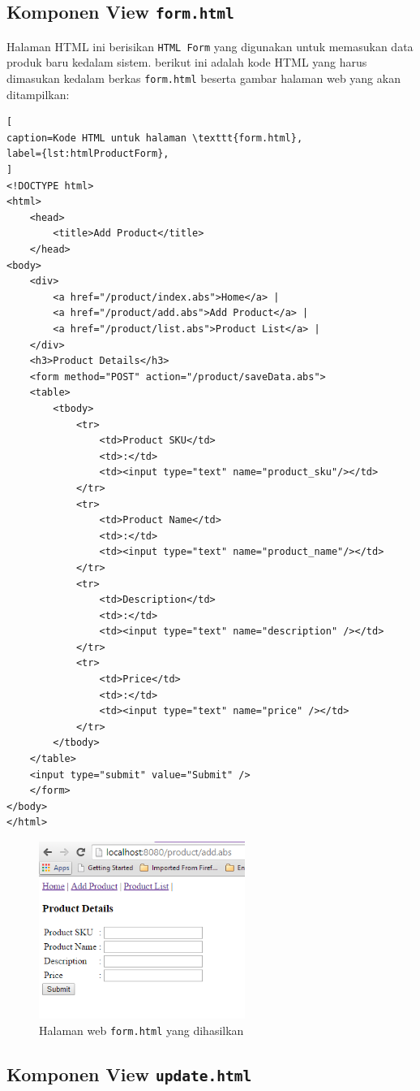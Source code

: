 \subsection{Komponen View \texttt{form.html}}
Halaman HTML ini berisikan \texttt{HTML Form} yang digunakan untuk memasukan data produk baru kedalam sistem. berikut ini adalah kode HTML yang harus dimasukan kedalam berkas \texttt{form.html} beserta gambar halaman web yang akan ditampilkan:

\begin{lstlisting}[
caption=Kode HTML untuk halaman \texttt{form.html},
label={lst:htmlProductForm},
]
<!DOCTYPE html>
<html>
	<head>
		<title>Add Product</title>
	</head>
<body>
	<div>
		<a href="/product/index.abs">Home</a> |
		<a href="/product/add.abs">Add Product</a> |
		<a href="/product/list.abs">Product List</a> |
	</div>
	<h3>Product Details</h3>
	<form method="POST" action="/product/saveData.abs">
	<table>
		<tbody>
			<tr>
				<td>Product SKU</td>
				<td>:</td>
				<td><input type="text" name="product_sku"/></td>
			</tr>
			<tr>
				<td>Product Name</td>
				<td>:</td>
				<td><input type="text" name="product_name"/></td>
			</tr>
			<tr>
				<td>Description</td>
				<td>:</td>
				<td><input type="text" name="description" /></td>
			</tr>
			<tr>
				<td>Price</td>
				<td>:</td>
				<td><input type="text" name="price" /></td>
			</tr>
		</tbody>
	</table>
	<input type="submit" value="Submit" />
	</form>
</body>
</html>
\end{lstlisting}

\begin{figure}
    \centering
    \includegraphics[width=0.6\textwidth]{img/hasil-add.png}
    \caption{Halaman web \texttt{form.html} yang dihasilkan}
    \label{fig:htmlForm}
\end{figure}

\subsection{Komponen View \texttt{update.html}}

